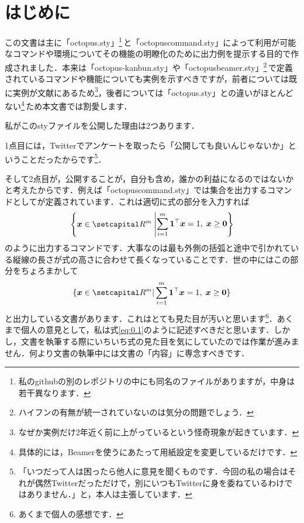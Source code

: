 \documentclass[uplatex]{jsreport}
\begin{document}
\section*{はじめに}
この文書は主に「octopus.sty」\footnote{私のgithubの別のレポジトリの中にも同名のファイルがありますが，中身は若干異なります．}\,と「octopuscommand.sty」によって利用が可能なコマンドや環境についてその機能の明瞭化のために出力例を提示する目的で作成されました．本来は「octopus-kanbun.sty」や「octopusbeamer.sty」\footnote{ハイフンの有無が統一されていないのは気分の問題でしょう．}\,で定義されているコマンドや機能についても実例を示すべきですが，前者については既に実例が文献\cite{oct-kanbun}にあるため\footnote{なぜか実例だけ2年近く前に上がっているという怪奇現象が起きています．}，後者については「octopus.sty」との違いがほとんどない\footnote{具体的には，Beamerを使うにあたって用紙設定を変更しているだけです．}\,ため本文書では割愛します．\par
\sukima
私がこのstyファイルを公開した理由は2つあります．\par
1点目には，Twitterでアンケートを取ったら「公開しても良いんじゃないか」ということだったからです\footnote{「いつだって人は困ったら他人に意見を聞くものです．今回の私の場合はそれが偶然Twitterだっただけで，別にいつもTwitterに身を委ねているわけではありません．」と，本人は主張しています．}．\par
そして2点目が，公開することが，自分も含め，誰かの利益になるのではないかと考えたからです．例えば「octopuscommand.sty」では集合を出力するコマンドとしてが定義されています．これは適切に式の部分を入力すれば
\begin{align}\label{eq:0.1}
  \set{\bm{x} \in \setR^{m}}[%
    \sum_{i=1}^{m} \bm{1}^{\top} \bm{x} = 1, \; \bm{x} \ge \bm{0}%
  ]%
\end{align}
のように出力するコマンドです．大事なのは最も外側の括弧と途中で引かれている縦線の長さが式の高さに合わせて長くなっていることです．世の中にはこの部分をちょろまかして
\begin{align}
  \{ \bm{x} \in \setR^{m} | \sum_{i=1}^{m} \bm{1}^{\top} \bm{x} = 1, \; \bm{x} \ge \bm{0} \}
\end{align}
と出力している文書があります．これはとても見た目が汚いと思います\footnote{あくまで個人の感想です．}．あくまで個人の意見として，私は式\eqref{eq:0.1}のように記述すべきだと思います．しかし，文書を執筆する際にいちいち式の見た目を気にしていたのでは作業が進みません．何より文書の執筆中には文書の「内容」に専念すべきです．\par
\end{document}
